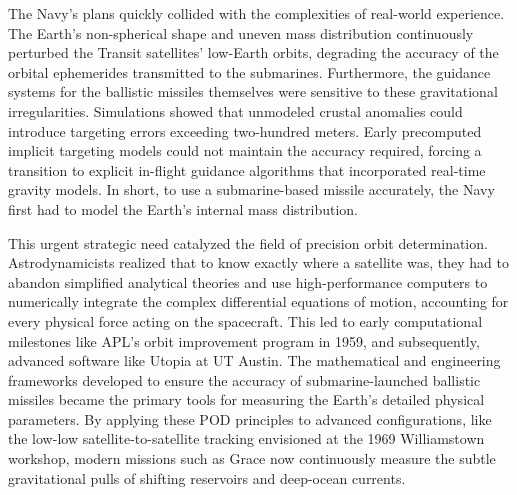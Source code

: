 The Navy’s plans quickly collided with the complexities of real-world experience. The Earth's non-spherical shape and uneven mass distribution continuously perturbed the Transit satellites' low-Earth orbits, degrading the accuracy of the orbital ephemerides transmitted to the submarines. Furthermore, the guidance systems for the ballistic missiles themselves were sensitive to these gravitational irregularities. Simulations showed that unmodeled crustal anomalies could introduce targeting errors exceeding two-hundred meters. Early precomputed implicit targeting models could not maintain the accuracy required, forcing a transition to explicit in-flight guidance algorithms that incorporated real-time gravity models. In short, to use a submarine-based missile accurately, the Navy first had to model the Earth's internal mass distribution.

This urgent strategic need catalyzed the field of precision orbit determination. Astrodynamicists realized that to know exactly where a satellite was, they had to abandon simplified analytical theories and use high-performance computers to numerically integrate the complex differential equations of motion, accounting for every physical force acting on the spacecraft. This led to early computational milestones like APL's orbit improvement program in 1959, and subsequently, advanced software like Utopia at UT Austin. The mathematical and engineering frameworks developed to ensure the accuracy of submarine-launched ballistic missiles became the primary tools for measuring the Earth's detailed physical parameters. By applying these POD principles to advanced configurations, like the low-low satellite-to-satellite tracking envisioned at the 1969 Williamstown workshop, modern missions such as Grace now continuously measure the subtle gravitational pulls of shifting reservoirs and deep-ocean currents. \cite{vetterEvolutionEarthGravitational1994}

